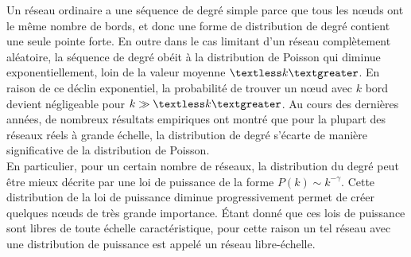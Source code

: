 Un réseau ordinaire a une séquence de degré simple parce que tous les nœuds ont le même nombre de bords, et donc une forme de distribution de degré contient une seule pointe forte. En outre dans le cas limitant d'un réseau complètement aléatoire, 
la séquence de degré obéit à la distribution de Poisson qui diminue exponentiellement, loin de la valeur moyenne $\textless k\textgreater$. En raison de ce déclin exponentiel, la probabilité de trouver un nœud avec $k$ bord devient négligeable pour  $k\gg \textless k\textgreater$.
Au cours des dernières années, de nombreux résultats empiriques ont montré que pour la plupart des réseaux réels à grande échelle, la distribution de degré s'écarte de manière significative de la distribution de Poisson.\\
En particulier, pour un certain nombre de réseaux, la distribution du degré peut être mieux décrite par une loi de puissance de la forme $P(k)\sim k^{-\gamma}$. Cette distribution de la loi de puissance diminue progressivement permet de créer quelques nœuds de très grande importance. Étant donné que ces lois de puissance sont libres de toute échelle caractéristique, pour cette raison un tel réseau avec une distribution de puissance est appelé un réseau libre-échelle.

